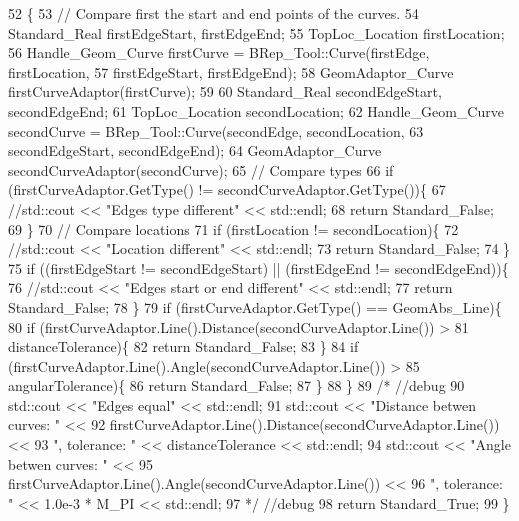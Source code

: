 \begin{DoxyCode}
52                                                                              \{
53     \textcolor{comment}{// Compare first the start and end points of the curves.}
54     Standard\_Real firstEdgeStart, firstEdgeEnd;
55     TopLoc\_Location firstLocation;
56     Handle\_Geom\_Curve firstCurve = BRep\_Tool::Curve(firstEdge, firstLocation,
57                                                     firstEdgeStart, firstEdgeEnd);
58     GeomAdaptor\_Curve firstCurveAdaptor(firstCurve);
59 
60     Standard\_Real secondEdgeStart, secondEdgeEnd;
61     TopLoc\_Location secondLocation;
62     Handle\_Geom\_Curve secondCurve = BRep\_Tool::Curve(secondEdge, secondLocation,
63                                                      secondEdgeStart, secondEdgeEnd);
64     GeomAdaptor\_Curve secondCurveAdaptor(secondCurve);
65     \textcolor{comment}{// Compare types}
66     \textcolor{keywordflow}{if} (firstCurveAdaptor.GetType() != secondCurveAdaptor.GetType())\{
67         \textcolor{comment}{//std::cout << "Edges type different" << std::endl;}
68         \textcolor{keywordflow}{return} Standard\_False;
69     \}
70     \textcolor{comment}{// Compare locations}
71     \textcolor{keywordflow}{if} (firstLocation != secondLocation)\{
72         \textcolor{comment}{//std::cout << "Location different" << std::endl;}
73         \textcolor{keywordflow}{return} Standard\_False;
74     \}
75     \textcolor{keywordflow}{if} ((firstEdgeStart != secondEdgeStart) || (firstEdgeEnd != secondEdgeEnd))\{
76         \textcolor{comment}{//std::cout << "Edges start or end different" << std::endl;}
77         \textcolor{keywordflow}{return} Standard\_False;
78     \}
79     \textcolor{keywordflow}{if} (firstCurveAdaptor.GetType() == GeomAbs\_Line)\{
80         \textcolor{keywordflow}{if} (firstCurveAdaptor.Line().Distance(secondCurveAdaptor.Line()) >
81                 distanceTolerance)\{
82             \textcolor{keywordflow}{return} Standard\_False;
83         \}
84         \textcolor{keywordflow}{if} (firstCurveAdaptor.Line().Angle(secondCurveAdaptor.Line()) >
85                 angularTolerance)\{
86             \textcolor{keywordflow}{return} Standard\_False;
87         \}
88     \}
89     \textcolor{comment}{/* //debug}
90 \textcolor{comment}{    std::cout << "Edges equal" << std::endl;}
91 \textcolor{comment}{    std::cout << "Distance betwen curves: " <<}
92 \textcolor{comment}{                 firstCurveAdaptor.Line().Distance(secondCurveAdaptor.Line()) <<}
93 \textcolor{comment}{                 ", tolerance: " << distanceTolerance << std::endl;}
94 \textcolor{comment}{    std::cout << "Angle betwen curves: " <<}
95 \textcolor{comment}{                 firstCurveAdaptor.Line().Angle(secondCurveAdaptor.Line()) <<}
96 \textcolor{comment}{                 ", tolerance: " << 1.0e-3 * M\_PI << std::endl;}
97 \textcolor{comment}{    */} \textcolor{comment}{//debug}
98     \textcolor{keywordflow}{return} Standard\_True;
99 \}
\end{DoxyCode}
